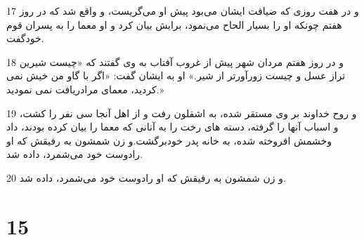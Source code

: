 \par 17 و در هفت روزی که ضیافت ایشان می‌بود پیش او می‌گریست، و واقع شد که در روز هفتم چونکه او را بسیار الحاح می‌نمود، برایش بیان کرد و او معما را به پسران قوم خودگفت.
\par 18 و در روز هفتم مردان شهر پیش از غروب آفتاب به وی گفتند که «چیست شیرین تراز عسل و چیست زورآورتر از شیر.» او به ایشان گفت: «اگر با گاو من خیش نمی کردید، معمای مرادریافت نمی نمودید.»
\par 19 و روح خداوند بر وی مستقر شده، به اشقلون رفت و از اهل آنجا سی نفر را کشت، و اسباب آنها را گرفته، دسته های رخت را به آنانی که معما را بیان کرده بودند، داد وخشمش افروخته شده، به خانه پدر خودبرگشت.و زن شمشون به رفیقش که او رادوست خود می‌شمرد، داده شد.
\par 20 و زن شمشون به رفیقش که او رادوست خود می‌شمرد، داده شد.
 
\chapter{15}


